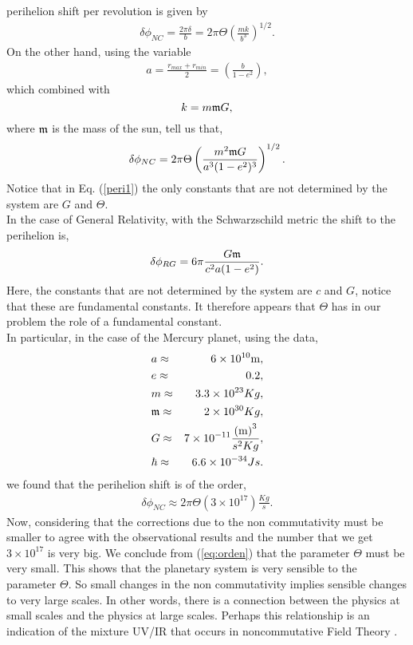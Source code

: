 \documentclass[a4paper,12pt]{article}
\newcommand{\rof}[1]{(\ref{eq:#1})}
\begin{document}
perihelion shift per revolution is given by
\begin{eqnarray}
\delta \phi_{NC}= \frac{2\pi \delta}{b}=2\pi \Theta \left(\frac{mk}{b^{3}}\right)^{1/2}.
\end{eqnarray}
On the other hand, using the variable
\begin{eqnarray}
a=\frac{r_{max}+r_{min}}{2}= \left(\frac{b}{1-e^{2}} \right) ,
\end{eqnarray}
which combined with
$$ k=m{\frak m}G, $$
where  ${\frak m}$ is the mass of the sun, tell us that,
\begin{eqnarray}\label{peri1}
\delta \phi_{NC} =2\pi \Theta\left( \frac{m^{2}{\frak
m}G}{a^{3}(1-e^{2})^{3}}\right)^{1/2}.
\end{eqnarray}
Notice that in Eq. (\ref{peri1})
the only constants that are not determined by the system are $G$ and $\Theta$. \\

In the case of General Relativity, with the Schwarzschild metric
the shift to the perihelion is,
\begin{eqnarray}
\delta \phi_{RG} = 6\pi \frac{G{\frak m}}{c^{2}a(1-e^{2})}.
\end{eqnarray}
Here, the constants that are not determined by the system are $c$
and $G$, notice that these are fundamental constants.  It
therefore appears that
$\Theta$ has in our problem the role of a fundamental constant.\\

In particular, in the case of the Mercury planet, using the data,
\begin{eqnarray}
&a \approx & 6\times 10^{10}{\rm m},\\
&e \approx & 0.2,\\
&m \approx & 3.3\times 10^{23} Kg,\\
&{\frak m} \approx & 2\times 10^{30}Kg,\\
&G \approx & 7\times 10^{-11} \frac{\text{(m)}^{3}}{s^{2}Kg},\\
&\hbar \approx & 6.6 \times 10^{-34}J s.
\end{eqnarray}
we found that the perihelion shift is of the order,
\begin{eqnarray}
\delta \phi_{NC} \approx 2\pi \Theta (3\times 10^{17})
\frac{Kg}{s}. \label{eq:orden}
\end{eqnarray}
Now, considering that the corrections due to the non commutativity
must be smaller to agree with the observational results and the
number that we get  $3\times 10^{17}$ is very big. We conclude
from \rof{orden} that the parameter $\Theta$ must be very small.
This shows that the planetary system is very sensible to the
parameter $\Theta$. So small changes in the non commutativity
implies sensible changes to very large scales. In other words,
there is a connection between the physics at small scales and the
physics at large scales. Perhaps this relationship is an
indication of the mixture UV/IR that occurs in noncommutative
Field Theory \cite{minwalla:gnus}.
\end{document}
